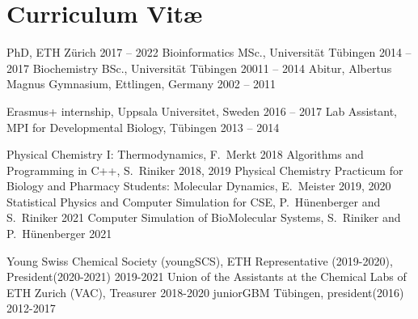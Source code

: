 \chapter{Curriculum Vit\ae}
\vspace{-1cm}
\begin{cvlist}
\end{cvlist}

\begin{cvlist}
\cventry
    {PhD, ETH Z\"{u}rich } %
    {2017 -- 2022} %
\cventry
    {Bioinformatics MSc., Universit\"{a}t T\"{u}bingen} %
    {2014 -- 2017} %
\cventry
    {Biochemistry BSc., Universit\"{a}t T\"{u}bingen} %
    {20011 -- 2014} %
\cventry
    {Abitur, Albertus Magnus Gymnasium, Ettlingen, Germany} %
    {2002 -- 2011} 
\end{cvlist}
\vspace{-0.25cm}
\begin{cvlist}
	\cventry
	{Erasmus+ internship, Uppsala Universitet, Sweden} %
	{2016 -- 2017} %
	\cventry
    {Lab Assistant, MPI for Developmental Biology, T\"{u}bingen} %
    {2013 -- 2014} %
\end{cvlist}
\vspace{-0.75cm}
\begin{cvlist}
	\cventry
	{Physical Chemistry I: Thermodynamics, F.\ Merkt} %
	{2018} %
	\cventry
	{Algorithms and Programming in C++, S.\ Riniker} %
	{2018, 2019} %
	\cventry
	{Physical Chemistry Practicum for Biology and Pharmacy Students: Molecular Dynamics, E.\ Meister} %
	{2019, 2020} %
	\cventry
	{Statistical Physics and Computer Simulation for CSE, P.\ H\"unenberger and S.\ Riniker} %
	{2021} %
	\cventry
	{Computer Simulation of BioMolecular Systems, S.\ Riniker and P.\ H\"unenberger} %
	{2021} %
\end{cvlist}
\vspace{-0.25cm}
\begin{cvlist}
	\cventry
	{Young Swiss Chemical Society (youngSCS), ETH Representative (2019-2020), President(2020-2021)} %
	{2019-2021} %
	\cventry
	{Union of the Assistants at the Chemical Labs of ETH Zurich (VAC), Treasurer} %
	{2018-2020} %
	\cventry
	{juniorGBM T\"ubingen, president(2016)} %
	{2012-2017} %
	
\end{cvlist}
